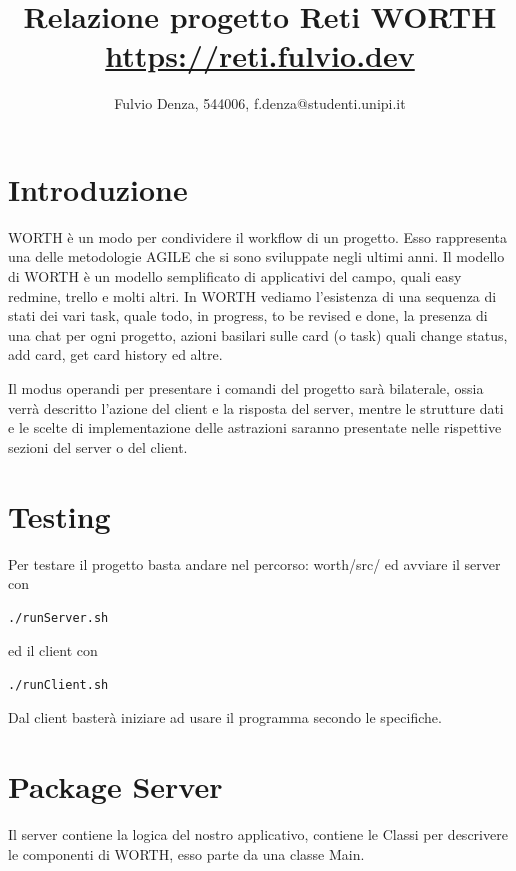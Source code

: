 \documentclass[]{article}
\title{Relazione progetto Reti WORTH
\\ \normalsize \url{https://reti.fulvio.dev}}
\author{Fulvio Denza, 544006, f.denza@studenti.unipi.it}
\begin{document}
\maketitle

\section{Introduzione}
WORTH è un modo per condividere il workflow di un progetto. Esso rappresenta una delle metodologie AGILE che si sono sviluppate negli ultimi anni. Il modello di WORTH è un modello semplificato di applicativi del campo, quali easy redmine, trello e molti altri. In WORTH vediamo l'esistenza di una sequenza di stati dei vari task, quale todo, in progress, to be revised e done, la presenza di una chat per ogni progetto, azioni basilari sulle card (o task) quali change status, add card, get card history ed altre.

Il modus operandi per presentare i comandi del progetto sarà bilaterale, ossia verrà descritto l'azione del client e la risposta del server, mentre le strutture dati e le scelte di implementazione delle astrazioni saranno presentate nelle rispettive sezioni del server o del client.
\section{Testing}
Per testare il progetto basta andare nel percorso:
worth/src/ ed avviare il server con
\begin{lstlisting}[language=bash]
	./runServer.sh
\end{lstlisting}
ed il client con
\begin{lstlisting}[language=bash]
	./runClient.sh
\end{lstlisting}
Dal client basterà iniziare ad usare il programma secondo le specifiche.
\section{Package Server}
Il server contiene la logica del nostro applicativo, contiene le Classi per descrivere le componenti di WORTH, esso parte da una classe Main.
\end{document}
